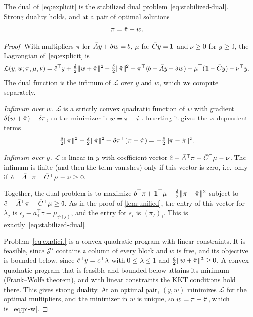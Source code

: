 \begin{theorem} \label{thm:explicit-duality}
The dual of~\eqref{eq:explicit} is the stabilized dual problem~\eqref{eq:stabilized-dual}.
Strong duality holds, and at a pair of optimal solutions
\begin{equation} \label{eq:pi-w}
\pi = \hat{\pi} + w .
\end{equation}
\end{theorem}

\begin{proof}
With multipliers $\pi$ for $\bar{A} y + \delta w = b$, $\mu$ for $\bar{C} y = \mathbf{1}$ and $\nu\ge0$
for $y\ge0$, the Lagrangian of~\eqref{eq:explicit} is
\[
\mathcal{L}(y,w;\pi,\mu,\nu) = \hat{c}^\top y + \tfrac{\delta}{2}\lVert w+\hat{\pi}\rVert^2
- \tfrac{\delta}{2}\lVert\hat{\pi}\rVert^2
+ \pi^\top(b - \bar{A} y - \delta w) + \mu^\top(\mathbf{1} - \bar{C} y) - \nu^\top y .
\]
The dual function is the infimum of $\mathcal{L}$ over $y$ and $w$, which we compute separately.

\emph{Infimum over $w$.} $\mathcal{L}$ is a strictly convex quadratic function of $w$ with
gradient $\delta(w+\hat{\pi}) - \delta\pi$, so the minimizer is $w = \pi - \hat{\pi}$. Inserting
it gives the $w$-dependent terms
\[
\tfrac{\delta}{2}\lVert\pi\rVert^2 - \tfrac{\delta}{2}\lVert\hat{\pi}\rVert^2
- \delta\pi^\top(\pi-\hat{\pi}) = -\tfrac{\delta}{2}\lVert\pi-\hat{\pi}\rVert^2 .
\]

\emph{Infimum over $y$.} $\mathcal{L}$ is linear in $y$ with coefficient vector
$\hat{c} - \bar{A}^\top\pi - \bar{C}^\top\mu - \nu$. The infimum is finite (and then the term
vanishes) only if this vector is zero, i.e.\ only if $\hat{c} - \bar{A}^\top\pi - \bar{C}^\top\mu = \nu\ge0$.

Together, the dual problem is to maximize $b^\top\pi + \mathbf{1}^\top\mu - \frac{\delta}{2}\lVert\pi-\hat{\pi}\rVert^2$
subject to $\hat{c} - \bar{A}^\top\pi - \bar{C}^\top\mu\ge0$. As in the proof of \cref{lem:unified}, the
entry of this vector for $\lambda_j$ is $c_j - a_j^\top\pi - \mu_{\psi(j)}$, and the entry for
$s_i$ is $(\pi_I)_i$. This is exactly~\eqref{eq:stabilized-dual}.

Problem~\eqref{eq:explicit} is a convex quadratic program with linear constraints. It is
feasible, since $\mathcal{J}'$ contains a column of every block and $w$ is free, and its
objective is bounded below, since $\hat{c}^\top y = c^\top\lambda$ with $0\le\lambda\le1$ and
$\frac{\delta}{2}\lVert w+\hat{\pi}\rVert^2\ge0$. A convex quadratic program that is feasible and
bounded below attains its minimum (Frank--Wolfe theorem), and with linear constraints the KKT
conditions hold there. This gives strong duality. At an optimal pair, $(y,w)$ minimizes
$\mathcal{L}$ for the optimal multipliers, and the minimizer in $w$ is unique, so
$w = \pi - \hat{\pi}$, which is~\eqref{eq:pi-w}.
\end{proof}

